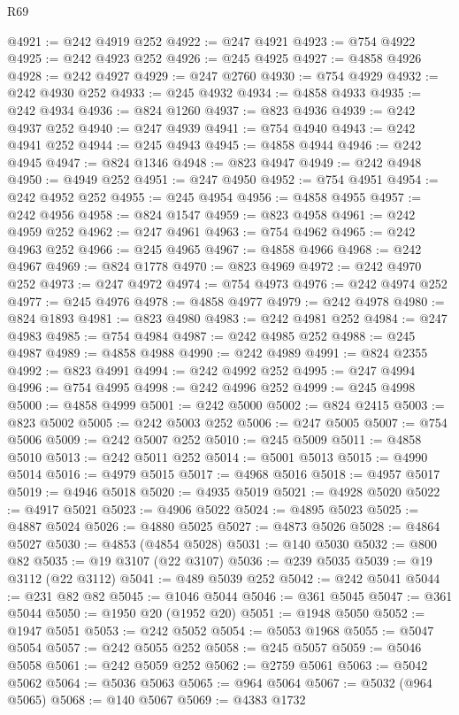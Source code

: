 \begin{lexlean}{R69}
\begin{coremodule}
{@4921 := @242 @4919 @252
@4922 := @247 @4921
@4923 := @754 @4922
@4925 := @242 @4923 @252
@4926 := @245 @4925
@4927 := @4858 @4926
@4928 := @242 @4927
@4929 := @247 @2760
@4930 := @754 @4929
@4932 := @242 @4930 @252
@4933 := @245 @4932
@4934 := @4858 @4933
@4935 := @242 @4934
@4936 := @824 @1260
@4937 := @823 @4936
@4939 := @242 @4937 @252
@4940 := @247 @4939
@4941 := @754 @4940
@4943 := @242 @4941 @252
@4944 := @245 @4943
@4945 := @4858 @4944
@4946 := @242 @4945
@4947 := @824 @1346
@4948 := @823 @4947
@4949 := @242 @4948
@4950 := @4949 @252
@4951 := @247 @4950
@4952 := @754 @4951
@4954 := @242 @4952 @252
@4955 := @245 @4954
@4956 := @4858 @4955
@4957 := @242 @4956
@4958 := @824 @1547
@4959 := @823 @4958
@4961 := @242 @4959 @252
@4962 := @247 @4961
@4963 := @754 @4962
@4965 := @242 @4963 @252
@4966 := @245 @4965
@4967 := @4858 @4966
@4968 := @242 @4967
@4969 := @824 @1778
@4970 := @823 @4969
@4972 := @242 @4970 @252
@4973 := @247 @4972
@4974 := @754 @4973
@4976 := @242 @4974 @252
@4977 := @245 @4976
@4978 := @4858 @4977
@4979 := @242 @4978
@4980 := @824 @1893
@4981 := @823 @4980
@4983 := @242 @4981 @252
@4984 := @247 @4983
@4985 := @754 @4984
@4987 := @242 @4985 @252
@4988 := @245 @4987
@4989 := @4858 @4988
@4990 := @242 @4989
@4991 := @824 @2355
@4992 := @823 @4991
@4994 := @242 @4992 @252
@4995 := @247 @4994
@4996 := @754 @4995
@4998 := @242 @4996 @252
@4999 := @245 @4998
@5000 := @4858 @4999
@5001 := @242 @5000
@5002 := @824 @2415
@5003 := @823 @5002
@5005 := @242 @5003 @252
@5006 := @247 @5005
@5007 := @754 @5006
@5009 := @242 @5007 @252
@5010 := @245 @5009
@5011 := @4858 @5010
@5013 := @242 @5011 @252
@5014 := @5001 @5013
@5015 := @4990 @5014
@5016 := @4979 @5015
@5017 := @4968 @5016
@5018 := @4957 @5017
@5019 := @4946 @5018
@5020 := @4935 @5019
@5021 := @4928 @5020
@5022 := @4917 @5021
@5023 := @4906 @5022
@5024 := @4895 @5023
@5025 := @4887 @5024
@5026 := @4880 @5025
@5027 := @4873 @5026
@5028 := @4864 @5027
@5030 := @4853 (@4854 @5028)
@5031 := @140 @5030
@5032 := @800 @82
@5035 := @19 @3107 (@22 @3107)
@5036 := @239 @5035
@5039 := @19 @3112 (@22 @3112)
@5041 := @489 @5039 @252
@5042 := @242 @5041
@5044 := @231 @82 @82
@5045 := @1046 @5044
@5046 := @361 @5045
@5047 := @361 @5044
@5050 := @1950 @20 (@1952 @20)
@5051 := @1948 @5050
@5052 := @1947 @5051
@5053 := @242 @5052
@5054 := @5053 @1968
@5055 := @5047 @5054
@5057 := @242 @5055 @252
@5058 := @245 @5057
@5059 := @5046 @5058
@5061 := @242 @5059 @252
@5062 := @2759 @5061
@5063 := @5042 @5062
@5064 := @5036 @5063
@5065 := @964 @5064
@5067 := @5032 (@964 @5065)
@5068 := @140 @5067
@5069 := @4383 @1732
}
\end{coremodule}
\end{lexlean}
